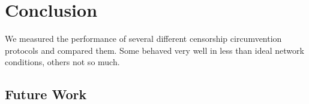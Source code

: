 
\chapter{Conclusion}
\label{chap:conclusion}

We measured the performance of several different censorship circumvention protocols and compared them. Some behaved very well in less than ideal network conditions, others not so much.

\section{Future Work}